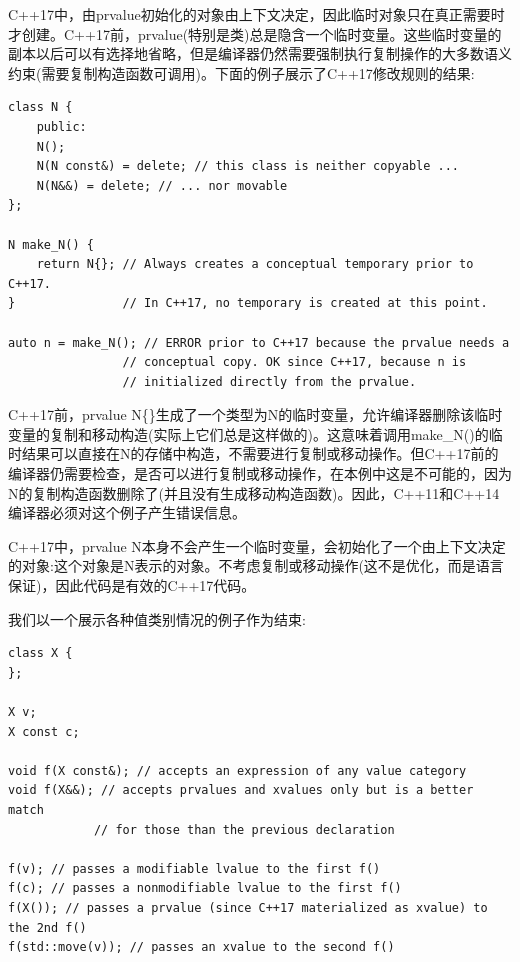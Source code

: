C++17中，由prvalue初始化的对象由上下文决定，因此临时对象只在真正需要时才创建。C++17前，prvalue(特别是类)总是隐含一个临时变量。这些临时变量的副本以后可以有选择地省略，但是编译器仍然需要强制执行复制操作的大多数语义约束(需要复制构造函数可调用)。下面的例子展示了C++17修改规则的结果:

\begin{lstlisting}[style=styleCXX]
class N {
	public:
	N();
	N(N const&) = delete; // this class is neither copyable ...
	N(N&&) = delete; // ... nor movable
};

N make_N() {
	return N{}; // Always creates a conceptual temporary prior to C++17.
} 				// In C++17, no temporary is created at this point.

auto n = make_N(); // ERROR prior to C++17 because the prvalue needs a
				// conceptual copy. OK since C++17, because n is
				// initialized directly from the prvalue.
\end{lstlisting}

C++17前，prvalue N\{\}生成了一个类型为N的临时变量，允许编译器删除该临时变量的复制和移动构造(实际上它们总是这样做的)。这意味着调用make\_N()的临时结果可以直接在N的存储中构造，不需要进行复制或移动操作。但C++17前的编译器仍需要检查，是否可以进行复制或移动操作，在本例中这是不可能的，因为N的复制构造函数删除了(并且没有生成移动构造函数)。因此，C++11和C++14编译器必须对这个例子产生错误信息。

C++17中，prvalue N本身不会产生一个临时变量，会初始化了一个由上下文决定的对象:这个对象是N表示的对象。不考虑复制或移动操作(这不是优化，而是语言保证)，因此代码是有效的C++17代码。

我们以一个展示各种值类别情况的例子作为结束:

\begin{lstlisting}[style=styleCXX]
class X {
};

X v;
X const c;

void f(X const&); // accepts an expression of any value category
void f(X&&); // accepts prvalues and xvalues only but is a better match
			// for those than the previous declaration

f(v); // passes a modifiable lvalue to the first f()
f(c); // passes a nonmodifiable lvalue to the first f()
f(X()); // passes a prvalue (since C++17 materialized as xvalue) to the 2nd f()
f(std::move(v)); // passes an xvalue to the second f()
\end{lstlisting}









